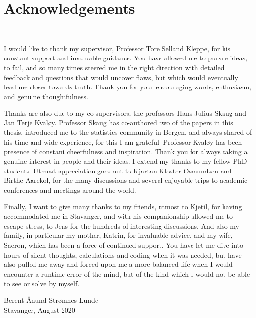 \chapter*{Acknowledgements}

\emergencystretch=\maxdimen
{}

I would like to thank my supervisor, Professor Tore Selland Kleppe, for his constant support and invaluable guidance. You have allowed me to 
pursue ideas, to fail, and so many times steered me in the right direction with detailed feedback and questions that would uncover flaws, but which would eventually lead me closer towards truth.
Thank you for your encouraging words, enthusiasm, and genuine thoughtfulness.

Thanks are also due to my co-supervisors, the professors Hans Julius Skaug and Jan Terje Kvaløy.
Professor Skaug has co-authored two of the papers in this thesis, introduced me to the statistics community in Bergen, and always shared of his time and wide experience, for this I am grateful.
Professor Kvaløy has been presence of constant cheerfulness and inspiration. Thank you for always taking a genuine interest in people and their ideas.
I extend my thanks to my fellow PhD-students. Utmost appreciation goes out to Kjartan Kloster Osmundsen and Birthe Aarekol, for the many discussions and several enjoyable trips to academic conferences and meetings around the world.


Finally, I want to give many thanks to my friends, utmost to Kjetil, for having accommodated me in Stavanger, and with his companionship allowed me to escape stress, to Jens for the hundreds of interesting discussions. And also my family, in particular my mother, Katrin, for invaluable advice, and my wife, Saeron, which has been a force of continued support. 
You have let me dive into hours of silent thoughts, calculations and coding when it was needed, but have also pulled me away and forced upon me a more balanced life when I would encounter a runtime error of the mind, but of the kind which I would not be able to see or solve by myself.
\vspace{42pt}

Berent Ånund Strømnes Lunde\\
Stavanger, August 2020